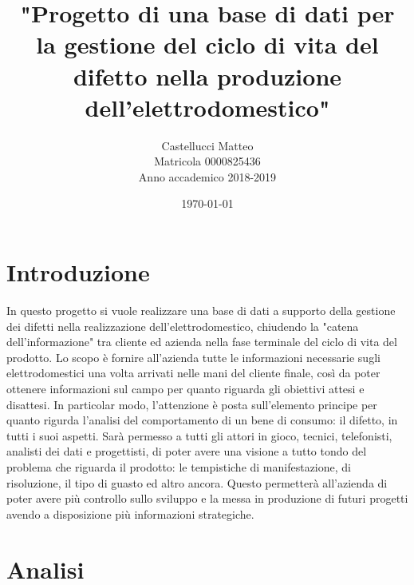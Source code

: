 \documentclass[a4paper, 12pt]{report}
\title{"Progetto di una base di dati per la gestione del ciclo di vita del difetto nella produzione dell'elettrodomestico"}
\author{Castellucci Matteo\\Matricola 0000825436\\Anno accademico 2018-2019}
\date{\today}
\begin{document}
\maketitle

\tableofcontents

\chapter{Introduzione}
In questo progetto si vuole realizzare una base di dati a supporto della gestione dei difetti nella realizzazione dell'elettrodomestico,
chiudendo la "catena dell'informazione" tra cliente ed azienda nella fase terminale del ciclo di vita del prodotto. Lo scopo è fornire
all'azienda tutte le informazioni necessarie sugli elettrodomestici una volta arrivati nelle mani del cliente finale, così da poter
ottenere informazioni sul campo per quanto riguarda gli obiettivi attesi e disattesi. In particolar modo, l'attenzione è posta sull'elemento
principe per quanto rigurda l'analisi del comportamento di un bene di consumo: il difetto, in tutti i suoi aspetti. Sarà permesso a tutti gli
attori in gioco, tecnici, telefonisti, analisti dei dati e progettisti, di poter avere una visione a tutto tondo del problema che riguarda
il prodotto: le tempistiche di manifestazione, di risoluzione, il tipo di guasto ed altro ancora. Questo permetterà all'azienda di poter
avere più controllo sullo sviluppo e la messa in produzione di futuri progetti avendo a disposizione più informazioni strategiche.

\chapter{Analisi}
\end{document}
